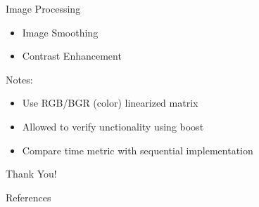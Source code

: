 \documentclass{beamer}
\begin{document}
\begin{frame}{Image Processing}
  \begin{itemize}
    \item Image Smoothing
    \item Contrast Enhancement
  \end{itemize}
  Notes:
  \begin{itemize}
    \item Use RGB/BGR (color) linearized matrix
    \item Allowed to verify unctionality using boost
    \item Compare time metric with sequential implementation
  \end{itemize}
\end{frame}

\begin{frame}
    \centering
    \Huge{Thank You!}
\end{frame}

\begin{frame}{References}
\end{frame}
\end{document}
